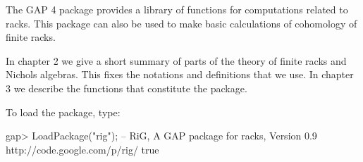 

The GAP 4 package {\RiG} provides a library of functions for computations
related to racks. This package can also be used to make basic calculations 
of cohomology of finite racks.
 
In chapter 2 we give a short summary of parts of the theory of finite racks
and Nichols algebras. This fixes the notations and definitions that we use. 
In chapter 3 we describe the functions that constitute the package.

To load the package, type: 

\beginexample
gap> LoadPackage("rig");
--
RiG, A GAP package for racks, Version 0.9
http://code.google.com/p/rig/
true
\endexample


